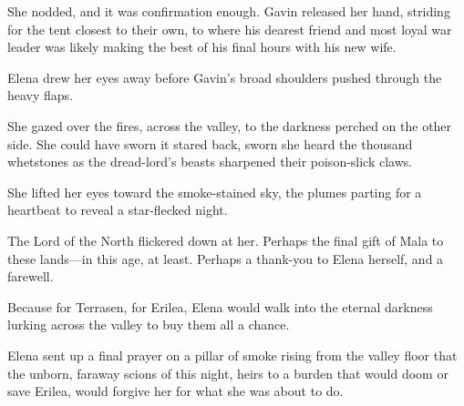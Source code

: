 She nodded, and it was confirmation enough. Gavin released her hand, striding for the tent closest to their own, to where his dearest friend and most loyal war leader was likely making the best of his final hours with his new wife.

Elena drew her eyes away before Gavin's broad shoulders pushed through the heavy flaps.

She gazed over the fires, across the valley, to the darkness perched on the other side. She could have sworn it stared back, sworn she heard the thousand whetstones as the dread-lord's beasts sharpened their poison-slick claws.

She lifted her eyes toward the smoke-stained sky, the plumes parting for a heartbeat to reveal a star-flecked night.

The Lord of the North flickered down at her. Perhaps the final gift of Mala to these lands---in this age, at least. Perhaps a thank-you to Elena herself, and a farewell.

Because for Terrasen, for Erilea, Elena would walk into the eternal darkness lurking across the valley to buy them all a chance.

Elena sent up a final prayer on a pillar of smoke rising from the valley floor that the unborn, faraway scions of this night, heirs to a burden that would doom or save Erilea, would forgive her for what she was about to do.
